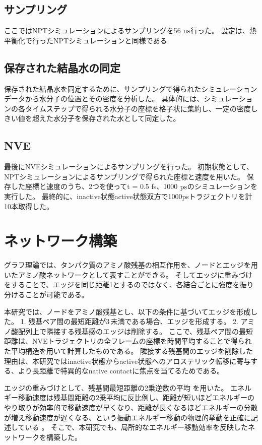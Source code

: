 \subsection{サンプリング}
ここではNP\gamma Tシミュレーションによるサンプリングを56 $\rm{ns}$行った。
設定は、熱平衡化で行ったNP\gamma Tシミュレーションと同様である.

\subsection{保存された結晶水の同定}
保存された結晶水を同定するために、サンプリングで得られたシミュレーションデータから水分子の位置とその密度を分析した。
具体的には、シミュレーションの各タイムステップで得られる水分子の座標を格子状に集約し、一定の密度しきい値を超えた水分子を保存された水として同定した。

\subsection{NVE}
最後にNVEシミュレーションによるサンプリングを行った。
初期状態として、NP\gamma Tシミュレーションによるサンプリングで得られた座標と速度を用いた。
保存した座標と速度のうち、2つを使って\Delta t = 0.5 fs、1000 $\rm{ps}$のシミュレーションを実行した。
最終的に、inactive状態active状態双方で1000psトラジェクトリを計10本取得した。

\section{ネットワーク構築}
グラフ理論では、タンパク質のアミノ酸残基の相互作用を、ノードとエッジを用いたアミノ酸ネットワークとして表すことができる。
そしてエッジに重みづけをすることで、エッジを同じ距離1とするのではなく、各結合ごとに強度を振り分けることが可能である。

本研究では、ノードをアミノ酸残基とし、以下の条件に基づいてエッジを形成した。
1. 残基ペア間の最短距離が3\,\text{\AA}未満である場合、エッジを形成する。
2. アミノ酸配列上で隣接する残基感のエッジは削除する。
ここで、残基ペア間の最短距離は、NVEトラジェクトリの全フレームの座標を時間平均することで得られた平均構造を用いて計算したものである。
隣接する残基間のエッジを削除した理由は、本研究ではinactive状態からactive状態へのアロステリック転移に寄与する、より長距離で特異的なnative contactに焦点を当てるためである。

エッジの重みづけとして、残基間最短距離の2乗逆数の平均\langle {} \rangle を用いた。
エネルギー移動速度は残基間距離の2乗平均に反比例し、距離が短いほどエネルギーのやり取りが効率的で移動速度が早くなり、距離が長くなるほどエネルギーの分散が増え移動速度が遅くなる、という振動エネルギー移動の物理的挙動を正確に記述している \cite{acs2025}。
そこで、本研究でも、局所的なエネルギー移動効率を反映したネットワークを構築した。


